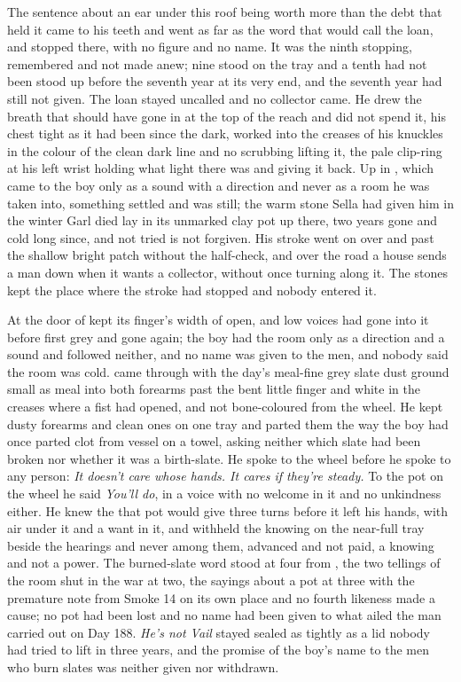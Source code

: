 The sentence about an ear under this roof being worth more than the debt that held it came to his teeth and went as far as the word that would call the loan, and stopped there, with no figure and no name. It was the ninth stopping, remembered and not made anew; nine stood on the tray and a tenth had not been stood up before the seventh year at its very end, and the seventh year had still not given. The loan stayed uncalled and no collector came. He drew the breath that should have gone in at the top of the reach and did not spend it, his chest tight as it had been since the dark,  worked into the creases of his knuckles in the colour of the clean dark line and no scrubbing lifting it, the pale clip-ring at his left wrist holding what light there was and giving it back. Up in , which came to the boy only as a sound with a direction and never as a room he was taken into, something settled and was still; the warm stone Sella had given him in the winter Garl died lay in its unmarked clay pot up there, two years gone and cold long since, and not tried is not forgiven. His stroke went on over  and past the shallow bright patch without the half-check, and over the road a house sends a man down when it wants a collector, without once turning along it. The stones kept the place where the stroke had stopped and nobody entered it.

\scenebreak

At  the door of  kept its finger's width of open, and low voices had gone into it before first grey and gone again; the boy had the room only as a direction and a sound and followed neither, and no name was given to the men, and nobody said the room was cold.  came through with the day's meal-fine grey slate dust ground small as meal into both forearms past the bent little finger and white in the creases where a fist had opened, and not bone-coloured  from the wheel. He kept dusty forearms and clean ones on one tray and parted them the way the boy had once parted clot from vessel on a towel, asking neither which slate had been broken nor whether it was a birth-slate. He spoke to the wheel before he spoke to any person: \emph{It doesn't care whose hands. It cares if they're steady.} To the pot on the wheel he said \emph{You'll do}, in a voice with no welcome in it and no unkindness either. He knew the  that pot would give three turns before it left his hands, with air under it and a want in it, and withheld the knowing on the near-full tray beside the hearings and never among them, advanced and not paid, a knowing and not a power. The burned-slate word stood at four from , the two tellings of the room shut in the war at two, the sayings about a pot at three with the premature note from Smoke 14 on its own place and no fourth likeness made a cause; no pot had been lost and no name had been given to what ailed the man carried out on Day 188. \emph{He's not Vail} stayed sealed as tightly as a lid nobody had tried to lift in three years, and the promise of the boy's name to the men who burn slates was neither given nor withdrawn.

